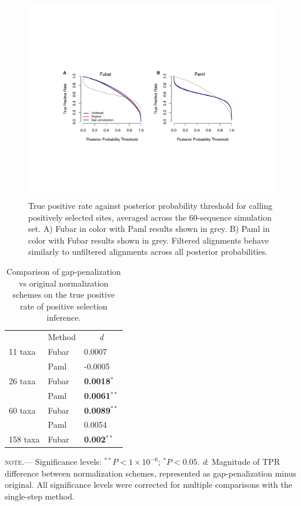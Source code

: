 \documentclass[10pt]{article}
\begin{document}
\begin{figure}[H]
\centerline{\includegraphics[width=7in]{Figures/fulltpr.pdf}}
\caption{\label{fulltpr} True positive rate against posterior probability threshold for calling positively selected sites, averaged across the 60-sequence simulation set. A) Fubar in color with Paml results shown in grey. B) Paml in color with Fubar results shown in grey. Filtered alignments behave similarly to unfiltered alignments across all posterior probabilities.}
\end{figure}



\begin{table}[H]
\caption {\label{tab:penalmodel} Comparison of gap-penalization vs original normalization schemes on the true positive rate of positive selection inference.}
\begin{tabular}{l l l}
\hline\noalign{\smallskip}
\multicolumn{1}{c}{Simulation Set} & \multicolumn{1}{c}{Method} & \multicolumn{1}{c}{\textit{d}} \\
\noalign{\smallskip}\hline\noalign{\smallskip}
11 taxa  & Fubar & 0.0007 \\
              & Paml & -0.0005\\
\hline
26 taxa   & Fubar & \textbf{0.0018}$^{\ast}$\\
              & Paml & \textbf{0.0061}$^{\ast\ast}$\\
\hline
60 taxa  & Fubar & \textbf{0.0089}$^{\ast\ast}$ \\
              & Paml & 0.0054  \\
\hline
158 taxa & Fubar & \textbf{0.002}$^{\ast\ast}$  \\
\hline
\end{tabular}
\newline
\textsc{note.}--- Significance levels: $^{\ast\ast} P < 1\times10^{-6}$; $^{\ast} P < 0.05$. \textit{d}: Magnitude of TPR difference between normalization schemes, represented as gap-penalization minus original. All significance levels were corrected for multiple comparisons with the single-step method.
\end{table}
\end{document}
